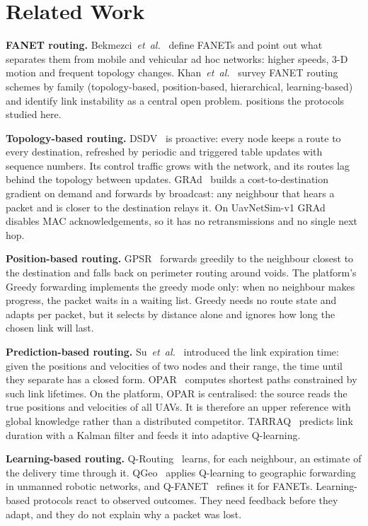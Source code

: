 \section{Related Work}
\label{sec:related}

\textbf{FANET routing.} Bekmezci~\emph{et~al.}~\cite{bekmezci2013fanet} define FANETs and point out what
separates them from mobile and vehicular ad hoc networks: higher speeds, 3-D motion and frequent topology
changes. Khan~\emph{et~al.}~\cite{khan2020survey} survey FANET routing schemes by family (topology-based,
position-based, hierarchical, learning-based) and identify link instability as a central open problem.
 positions the protocols studied here.

\textbf{Topology-based routing.} DSDV~\cite{perkins1994dsdv} is proactive: every node keeps a route to every
destination, refreshed by periodic and triggered table updates with sequence numbers. Its control traffic
grows with the network, and its routes lag behind the topology between updates. GRAd~\cite{poor2001grad}
builds a cost-to-destination gradient on demand and forwards by broadcast: any neighbour that hears a packet
and is closer to the destination relays it. On UavNetSim-v1 GRAd disables MAC acknowledgements, so it has no
retransmissions and no single next hop.

\textbf{Position-based routing.} GPSR~\cite{karp2000gpsr} forwards greedily to the neighbour closest to the
destination and falls back on perimeter routing around voids. The platform's Greedy forwarding implements
the greedy mode only: when no neighbour makes progress, the packet waits in a waiting list. Greedy needs no
route state and adapts per packet, but it selects by distance alone and ignores how long the chosen link
will last.

\textbf{Prediction-based routing.} Su~\emph{et~al.}~\cite{su2001mobility} introduced the link expiration
time: given the positions and velocities of two nodes and their range, the time until they separate has a
closed form. OPAR~\cite{gharib2021opar} computes shortest paths constrained by such link lifetimes. On the
platform, OPAR is centralised: the source reads the true positions and velocities of all UAVs. It is
therefore an upper reference with global knowledge rather than a distributed competitor. TARRAQ~\cite{cui2022tarraq}
predicts link duration with a Kalman filter and feeds it into adaptive Q-learning.

\textbf{Learning-based routing.} Q-Routing~\cite{boyan1993qrouting} learns, for each neighbour, an estimate
of the delivery time through it. QGeo~\cite{jung2017qgeo} applies Q-learning to geographic forwarding in
unmanned robotic networks, and Q-FANET~\cite{dacosta2021qfanet} refines it for FANETs. Learning-based
protocols react to observed outcomes. They need feedback before they adapt, and they do not explain why a
packet was lost.

